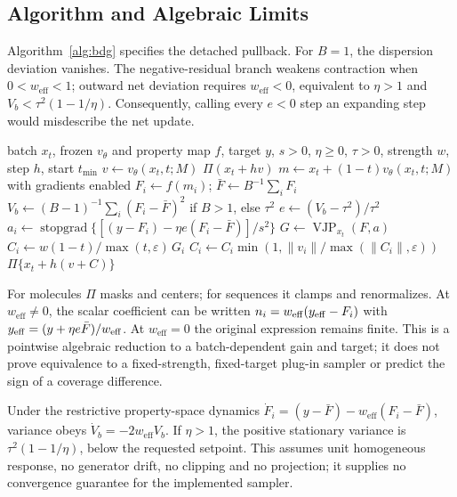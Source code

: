 \documentclass{article}
\newcommand{\Fbar}{\bar F}
\newcommand{\weff}{w_{\mathrm{eff}}}
\newcommand{\sg}{\operatorname{stopgrad}}
\begin{document}
\subsection{Algorithm and Algebraic Limits}\label{app:algebra}
Algorithm~\ref{alg:bdg} specifies the detached pullback. For $B=1$, the dispersion deviation vanishes. The negative-residual branch weakens contraction when $0<\weff<1$; outward net deviation requires $\weff<0$, equivalent to $\eta>1$ and $V_b<\tau^2(1-1/\eta)$. Consequently, calling every $e<0$ step an expanding step would misdescribe the net update.
\begin{algorithm}[H]
\caption{One BDG-guided Euler step}\label{alg:bdg}
\begin{algorithmic}[1]
\Require batch $x_t$, frozen $v_\theta$ and property map $f$, target $y$, $s>0$, $\eta\ge0$, $\tau>0$, strength $w$, step $h$, start $t_{\min}$
\State $v\gets v_\theta(x_t,t;M)$
 \State \Return $\Pi(x_t+hv)$ \EndIf
\State $m\gets x_t+(1-t)v_\theta(x_t,t;M)$ with gradients enabled
\State $F_i\gets f(m_i)$; $\Fbar\gets B^{-1}\sum_iF_i$
\State $V_b\gets(B-1)^{-1}\sum_i(F_i-\Fbar)^2$ if $B>1$, else $\tau^2$
\State $e\gets(V_b-\tau^2)/\tau^2$
\State $a_i\gets\sg\{[(y-F_i)-\eta e(F_i-\Fbar)]/s^2\}$
\State $G\gets\operatorname{VJP}_{x_t}(F,a)$
\State $C_i\gets w(1-t)/\max(t,\varepsilon)\,G_i$
\State $C_i\gets C_i\min(1,\|v_i\|/\max(\|C_i\|,\varepsilon))$
\State \Return $\Pi\{x_t+h(v+C)\}$
\end{algorithmic}
\end{algorithm}
For molecules $\Pi$ masks and centers; for sequences it clamps and renormalizes. At $\weff\ne0$, the scalar coefficient can be written $n_i=\weff(y_{\rm eff}-F_i)$ with $y_{\rm eff}=(y+\eta e\Fbar)/\weff$. At $\weff=0$ the original expression remains finite. This is a pointwise algebraic reduction to a batch-dependent gain and target; it does not prove equivalence to a fixed-strength, fixed-target plug-in sampler or predict the sign of a coverage difference.

Under the restrictive property-space dynamics $\dot F_i=(y-\Fbar)-\weff(F_i-\Fbar)$, variance obeys $\dot V_b=-2\weff V_b$. If $\eta>1$, the positive stationary variance is $\tau^2(1-1/\eta)$, below the requested setpoint. This assumes unit homogeneous response, no generator drift, no clipping and no projection; it supplies no convergence guarantee for the implemented sampler.
\end{document}

